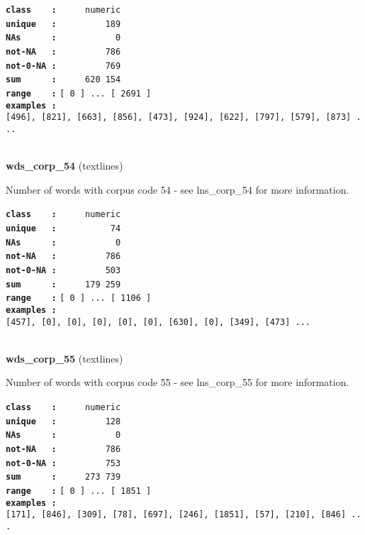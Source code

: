 \documentclass[]{article}
\begin{document}
\textbf{\texttt{class\ \ \ \ :}} \texttt{~~~~~numeric}\\
\textbf{\texttt{unique\ \ \ :}} \texttt{~~~~~~~~~189}\\
\textbf{\texttt{NAs\ \ \ \ \ \ :}} \texttt{~~~~~~~~~~~0}\\
\textbf{\texttt{not-NA\ \ \ :}} \texttt{~~~~~~~~~786}\\
\textbf{\texttt{not-0-NA\ :}} \texttt{~~~~~~~~~769}\\
\textbf{\texttt{sum\ \ \ \ \ \ :}} \texttt{~~~~~620~154}\\
\textbf{\texttt{range\ \ \ \ :}}
\texttt{{[}\ 0\ {]}\ ...\ {[}\ 2691\ {]}}\\
\textbf{\texttt{examples\ :}}
\texttt{{[}496{]},\ {[}821{]},\ {[}663{]},\ {[}856{]},\ {[}473{]},\ {[}924{]},\ {[}622{]},\ {[}797{]},\ {[}579{]},\ {[}873{]}\ ...}\\

~

\textbf{wds\_corp\_54} (textlines)

Number of words with corpus code 54 - see lns\_corp\_54 for more
information.

\textbf{\texttt{class\ \ \ \ :}} \texttt{~~~~~numeric}\\
\textbf{\texttt{unique\ \ \ :}} \texttt{~~~~~~~~~~74}\\
\textbf{\texttt{NAs\ \ \ \ \ \ :}} \texttt{~~~~~~~~~~~0}\\
\textbf{\texttt{not-NA\ \ \ :}} \texttt{~~~~~~~~~786}\\
\textbf{\texttt{not-0-NA\ :}} \texttt{~~~~~~~~~503}\\
\textbf{\texttt{sum\ \ \ \ \ \ :}} \texttt{~~~~~179~259}\\
\textbf{\texttt{range\ \ \ \ :}}
\texttt{{[}\ 0\ {]}\ ...\ {[}\ 1106\ {]}}\\
\textbf{\texttt{examples\ :}}
\texttt{{[}457{]},\ {[}0{]},\ {[}0{]},\ {[}0{]},\ {[}0{]},\ {[}0{]},\ {[}630{]},\ {[}0{]},\ {[}349{]},\ {[}473{]}\ ...}\\

~

\textbf{wds\_corp\_55} (textlines)

Number of words with corpus code 55 - see lns\_corp\_55 for more
information.

\textbf{\texttt{class\ \ \ \ :}} \texttt{~~~~~numeric}\\
\textbf{\texttt{unique\ \ \ :}} \texttt{~~~~~~~~~128}\\
\textbf{\texttt{NAs\ \ \ \ \ \ :}} \texttt{~~~~~~~~~~~0}\\
\textbf{\texttt{not-NA\ \ \ :}} \texttt{~~~~~~~~~786}\\
\textbf{\texttt{not-0-NA\ :}} \texttt{~~~~~~~~~753}\\
\textbf{\texttt{sum\ \ \ \ \ \ :}} \texttt{~~~~~273~739}\\
\textbf{\texttt{range\ \ \ \ :}}
\texttt{{[}\ 0\ {]}\ ...\ {[}\ 1851\ {]}}\\
\textbf{\texttt{examples\ :}}
\texttt{{[}171{]},\ {[}846{]},\ {[}309{]},\ {[}78{]},\ {[}697{]},\ {[}246{]},\ {[}1851{]},\ {[}57{]},\ {[}210{]},\ {[}846{]}\ ...}\\
\end{document}
